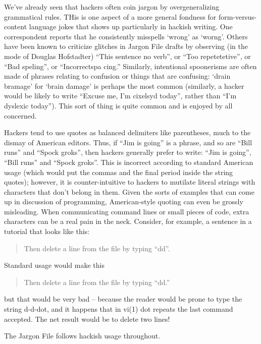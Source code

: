 We've already seen that hackers often coin jargon by overgeneralizing
grammatical rules. THis is one aspect of a more general fondness for
form-versus-content language jokes that shows up particularly in hackish
writing. One correspondent reports that he consistently misspells `wrong' as
`worng'. Others have been known to criticize glitches in Jargon File drafts by
observing (in the mode of Douglas Hofstadter) ``This sentence no verb'', or
``Too repetetetive'', or ``Bad speling'', or ``Incorrectspa cing.'' Similarly,
intentional spoonerisms are often made of phrases relating to confusion or
things that are confusing: `drain bramage' for `brain damage' is perhaps the
most common (similarly, a hacker would be likely to write ``Excuse me, I'm
cixelsyd today'', rather than ``I'm dyslexic today''). This sort of thing is
quite common and is enjoyed by all concerned.

Hackers tend to use quotes as balanced delimiters like parentheses, much to the
dismay of American editors. Thus, if ``Jim is going'' is a phrase, and so are
``Bill runs'' and ``Spock groks'', then hackers generally prefer to write:
``Jim is going'', ``Bill runs'' and ``Spock groks''. This is incorrect
according to standard American usage (which would put the commas and the final
period inside the string quotes); however, it is counter-intuitive to hackers
to mutilate literal strings with characters that don't belong in them. Given
the sorts of examples that can come up in discussion of programming,
American-style quoting can even be grossly misleading. When communicating
command lines or small pieces of code, extra characters can be a real pain in
the neck.  Consider, for example, a sentence in a  tutorial that
looks like this:

\begin{quote}
	Then delete a line from the file by typing ``dd''.
\end{quote}

Standard usage would make this

\begin{quote}
	Then delete a line from the file by typing ``dd.''
\end{quote}

but that would be very bad -- because the reader would be prone to type the
string d-d-dot, and it happens that in vi(1) dot repeats the last command
accepted. The net result would be to delete two lines!

The Jargon File follows hackish usage throughout.

